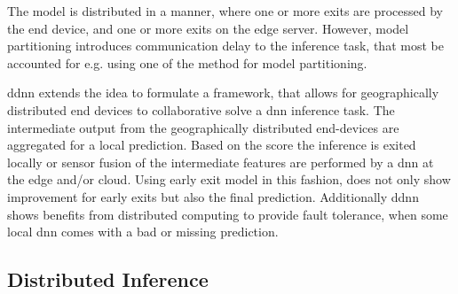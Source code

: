 \begin{enumdescript}
	The model is distributed in a manner, where one or more exits are processed by the end device, and one or more exits on the edge server. However, model partitioning introduces communication delay to the inference task, that most be accounted for e.g. using one of the method for model partitioning.
	
	\gls{ddnn} \cite{teerapittayanon_distributed_2017} extends the idea to formulate a framework, that allows for geographically distributed end devices to collaborative solve a \gls{dnn} inference task. The intermediate output from the geographically distributed end-devices are aggregated for a local prediction. Based on the score the inference is exited locally or sensor fusion of the intermediate features are performed by a \gls{dnn} at the edge and/or cloud. Using early exit model in this fashion, does not only show improvement for early exits but also the final prediction. Additionally \gls{ddnn} shows benefits from distributed computing to provide fault tolerance, when some local \gls{dnn} comes with a bad or missing prediction. 
\end{enumdescript}

\subsection{Distributed Inference}









